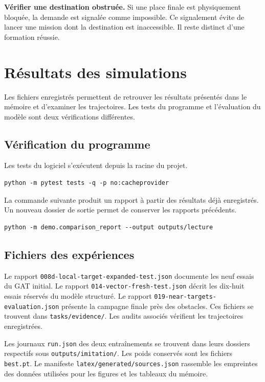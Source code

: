\textbf{Vérifier une destination obstruée.} Si une place finale est physiquement bloquée, la demande est signalée comme impossible. Ce signalement évite de lancer une mission dont la destination est inaccessible. Il reste distinct d'une formation réussie.

\chapter*{Résultats des simulations}
\label{ann:resultats}
Les fichiers enregistrés permettent de retrouver les résultats présentés dans le mémoire et d'examiner les trajectoires. Les tests du programme et l'évaluation du modèle sont deux vérifications différentes.

\section*{Vérification du programme}
Les tests du logiciel s'exécutent depuis la racine du projet.
\begin{verbatim}
python -m pytest tests -q -p no:cacheprovider
\end{verbatim}
La commande suivante produit un rapport à partir des résultats déjà enregistrés. Un nouveau dossier de sortie permet de conserver les rapports précédents.
\begin{verbatim}
python -m demo.comparison_report --output outputs/lecture
\end{verbatim}

\section*{Fichiers des expériences}
Le rapport \texttt{008d-local-target-expanded-test.json} documente les neuf essais du GAT initial. Le rapport \texttt{014-vector-fresh-test.json} décrit les dix-huit essais réservés du modèle structuré. Le rapport \texttt{019-near-targets-evaluation.json} présente la campagne finale près des obstacles. Ces fichiers se trouvent dans \texttt{tasks/evidence/}. Les audits associés vérifient les trajectoires enregistrées.

Les journaux \texttt{run.json} des deux entraînements se trouvent dans leurs dossiers respectifs sous \texttt{outputs/imitation/}. Les poids conservés sont les fichiers \texttt{best.pt}. Le manifeste \texttt{latex/generated/sources.json} rassemble les empreintes des données utilisées pour les figures et les tableaux du mémoire.

